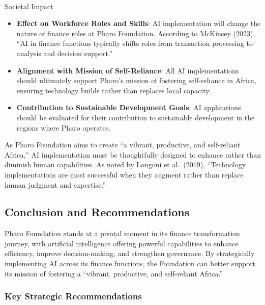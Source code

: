 \documentclass[
]{article}
\makeatletter
\let\oldparagraph\paragraph
\renewcommand{\paragraph}{
    \@ifstar
      \xxxParagraphStar
      \xxxParagraphNoStar
  }
\newcommand{\xxxParagraphStar}[1]{\oldparagraph*{#1}\mbox{}}
\newcommand{\xxxParagraphNoStar}[1]{\oldparagraph{#1}\mbox{}}
\makeatother
\begin{document}
\paragraph{Societal Impact}\label{societal-impact}

\begin{itemize}
\item
  \textbf{Effect on Workforce Roles and Skills}: AI implementation will
  change the nature of finance roles at Pharo Foundation. According to
  McKinsey (2023), ``AI in finance functions typically shifts roles from
  transaction processing to analysis and decision support.''
\item
  \textbf{Alignment with Mission of Self-Reliance}: All AI
  implementations should ultimately support Pharo's mission of fostering
  self-reliance in Africa, ensuring technology builds rather than
  replaces local capacity.
\item
  \textbf{Contribution to Sustainable Development Goals}: AI
  applications should be evaluated for their contribution to sustainable
  development in the regions where Pharo operates.
\end{itemize}

As Pharo Foundation aims to create ``a vibrant, productive, and
self-reliant Africa,'' AI implementation must be thoughtfully designed
to enhance rather than diminish human capabilities. As noted by Longoni
et al.~(2019), ``Technology implementations are most successful when
they augment rather than replace human judgment and expertise.''

\subsection{Conclusion and
Recommendations}\label{conclusion-and-recommendations}

Pharo Foundation stands at a pivotal moment in its finance
transformation journey, with artificial intelligence offering powerful
capabilities to enhance efficiency, improve decision-making, and
strengthen governance. By strategically implementing AI across its
finance functions, the Foundation can better support its mission of
fostering a ``vibrant, productive, and self-reliant Africa.''

\subsubsection{Key Strategic
Recommendations}\label{key-strategic-recommendations}
\end{document}
